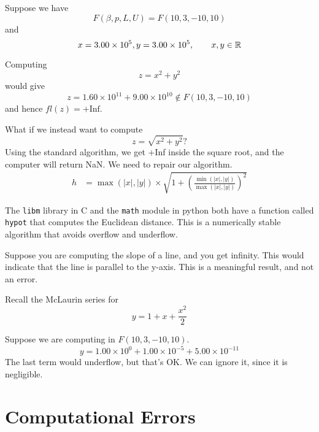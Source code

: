 \begin{example}
    Suppose we have \[
        F(\beta, p, L, U ) = F(10, 3, -10, 10)
    \] and \[
        x = 3.00 \times 10^5, y = 3.00 \times 10^5, \qquad x, y \in \mathbb{R}
    \]

    Computing \[
        z = x^2 + y^2
    \] would give \[
        z = 1.60 \times 10^{11} + 9.00 \times 10^{10} \notin F(10, 3, -10, 10)
    \] and hence \( fl(z) = +\text{Inf} \).

    What if we instead want to compute \[
        z = \sqrt{x^2 + y^2}?
    \]
    Using the standard algorithm, we get +Inf inside the square root, and the computer will return NaN. We need to repair our algorithm.
    \begin{align*}
        h & = \max(|x|, |y|) \times \sqrt{1 + \left(\frac{\min(|x|, |y|)}{\max(|x|, |y|)} \right)^2}
    \end{align*}
\end{example}

\begin{remark}
    The \texttt{libm} library in C and the \texttt{math} module in python both have a function called \texttt{hypot} that computes the Euclidean distance. This is a numerically stable algorithm that avoids overflow and underflow.
\end{remark}

\begin{note}
    Suppose you are computing the slope of a line, and you get infinity. This would indicate that the line is parallel to the y-axis. This is a meaningful result, and not an error.
\end{note}

\begin{note}


    Recall the McLaurin series for \[
        y = 1 + x + \frac{x^2}{2}
    \]

    Suppose we are computing in \( F(10, 3, -10, 10) \). \[
        y = 1.00 \times 10^0 + 1.00 \times 10^{-5} + 5.00 \times 10^{-11}
    \] The last term would underflow, but that's OK. We can ignore it, since it is negligible.
\end{note}

\section{Computational Errors}

